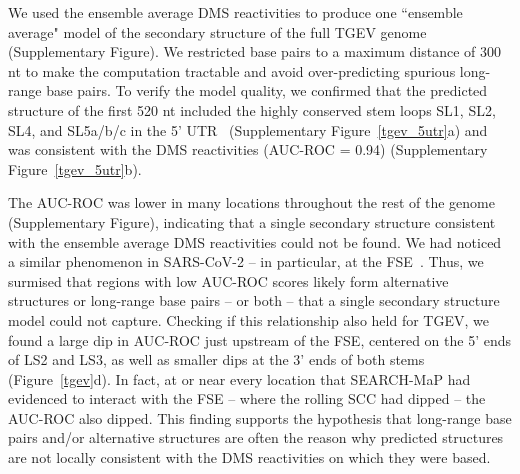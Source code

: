 \documentclass[main.tex]{subfiles}
\begin{document}
We used the ensemble average DMS reactivities to produce one ``ensemble average" model of the secondary structure of the full TGEV genome (Supplementary Figure).
We restricted base pairs to a maximum distance of 300 nt to make the computation tractable and avoid over-predicting spurious long-range base pairs.
To verify the model quality, we confirmed that the predicted structure of the first 520 nt included the highly conserved stem loops SL1, SL2, SL4, and SL5a/b/c in the 5' UTR~\cite{Yang2015a} (Supplementary Figure~\ref{tgev_5utr}a) and was consistent with the DMS reactivities (AUC-ROC = 0.94) (Supplementary Figure~\ref{tgev_5utr}b).

The AUC-ROC was lower in many locations throughout the rest of the genome (Supplementary Figure), indicating that a single secondary structure consistent with the ensemble average DMS reactivities could not be found.
We had noticed a similar phenomenon in SARS-CoV-2 -- in particular, at the FSE~\cite{Lan2022}.
Thus, we surmised that regions with low AUC-ROC scores likely form alternative structures or long-range base pairs -- or both -- that a single secondary structure model could not capture.
Checking if this relationship also held for TGEV, we found a large dip in AUC-ROC just upstream of the FSE, centered on the 5' ends of LS2 and LS3, as well as smaller dips at the 3' ends of both stems (Figure~\ref{tgev}d).
In fact, at or near every location that SEARCH-MaP had evidenced to interact with the FSE -- where the rolling SCC had dipped -- the AUC-ROC also dipped.
This finding supports the hypothesis that long-range base pairs and/or alternative structures are often the reason why predicted structures are not locally consistent with the DMS reactivities on which they were based.
\end{document}
